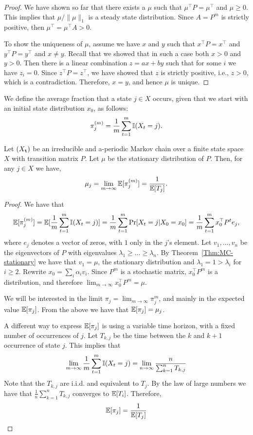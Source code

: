 \begin{proof}
We have shown so far that there exists a $\mu$ such that $\mu^\top
P=\mu^\top$ and $\mu\geq 0$. This implies that $\mu/\|\mu\|_1$ is a steady state distribution.
Since $A=P^m$ is strictly positive,
then $\mu^\top=\mu^\top A >0$.

To show the uniqueness of $\mu$, assume we have $x$ and $y$ such
that $x^\top P=x^\top$ and $y^\top P=y^\top$ and $x\neq y$. Recall
that we showed that in such a case both $x>0$ and $y>0$. Then there
is a linear combination $z=ax+by$ such that for some $i$ we have
$z_i=0$. Since $z^\top P=z^\top$, we have showed that $z$ is
strictly positive, i.e., $z>0$, which is a contradiction. Therefore,
$x=y$, and hence $\mu$ is unique.
\end{proof}

We define the average fraction that a state $j\in X$ occurs, given
that we start with an initial state distribution $x_0$,  as follows:
\[
\pi^{(m)}_j=\frac{1}{m}\sum_{t=1}^m \mathbb{I} (X_t=j).
\]

\begin{theorem}\label{thm:MC_expected_return_time}
Let $({X_{\tt t}})$ be an irreducible and  a-periodic Markov chain
over a finite state space $X$ with transition matrix $P$. Let $\mu$
be the stationary distribution of $P$. Then, for any $j\in X$ we have,
\[
\mu_j=\lim_{m\rightarrow\infty} \mathbb{E}[\pi^{(m)}_j] =\frac{1}{\mathbb{E}[T_j]}.
\]
\end{theorem}

\begin{proof}
We have that
\[
\mathbb{E}[\pi^{(m)}_j]=\mathbb{E}[\frac{1}{m}\sum_{t=1}^m \mathbb{I}
(X_t=j)]=\frac{1}{m}\sum_{t=1}^m \Pr
[X_t=j|X_0=x_0]=\frac{1}{m}\sum_{t=1}^m x_0^\top P^t e_j,
\]
where $e_j$ denotes a vector of zeros, with $1$ only in the $j$'s element. Let $v_1, \ldots , v_n$ be the eigenvectors of $P$ with eigenvalues
$\lambda_1 \geq  \ldots \geq  \lambda_n$. By
Theorem~\ref{Thm:MC-stationary} we have that $v_1=\mu$, the stationary
distribution and $\lambda_1=1>\lambda_i$ for $i\geq 2$. Rewrite
$x_0=\sum_i \alpha_i v_i$. Since $P^m$ is a stochastic matrix,
$x_0^\top P^m$ is a distribution, and therefore $\lim_{m\rightarrow
\infty} x_0^\top P^m=\mu$.

We will be interested in the limit $\pi_j=\lim_{m\rightarrow \infty}
\pi^{m}_j $, and mainly in the expected value $\mathbb{E}[\pi_j]$. From the
above we have that $\mathbb{E}[\pi_j]=\mu_j$.

A different way to express $\mathbb{E}[\pi_j]$ is using a variable time
horizon, with a fixed number of occurrences of $j$. Let $T_{k,j}$ be
the time between the $k$ and $k+1$ occurrence of state $j$. This
implies that
\[
\lim_{m\rightarrow\infty}\frac{1}{m}\sum_{t=1}^m \mathbb{I} (X_t=j) =
\lim_{n\rightarrow\infty} \frac{n}{\sum_{k=1}^n T_{k,j}}
\]
Note that the $T_{k,j}$ are i.i.d. and equivalent to $T_j$. By the
law of large numbers we have that $\frac{1}{n}\sum_{k=1}^n T_{k,j}$
converges to $\mathbb{E}[T_i]$. Therefore,
\[
\mathbb{E}[\pi_j]=\frac{1}{\mathbb{E}[T_j]}
\]
\end{proof}

